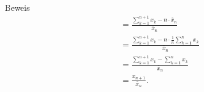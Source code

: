\documentclass[10pt]{beamer}
\begin{document}
\begin{frame}{Beweis}
    \begin{align*}
         & = \frac{\sum_{k = 1}^{n + 1} x_{k} - n \cdot \bar{x}_{n}}{\bar{x}_{n}} \\
         & = \frac{\sum_{k = 1}^{n + 1} x_{k} - n \cdot \frac{1}{n} \sum_{k = 1}^{n} x_{k}}{\bar{x}_{n}} \\
         & = \frac{\sum_{k = 1}^{n + 1} x_{k} - \sum_{k = 1}^{n} x_{k}}{\bar{x}_{n}} \\
         & = \frac{x_{n + 1}}{\bar{x}_{n}}.
    \end{align*}
\end{frame}
\end{document}
